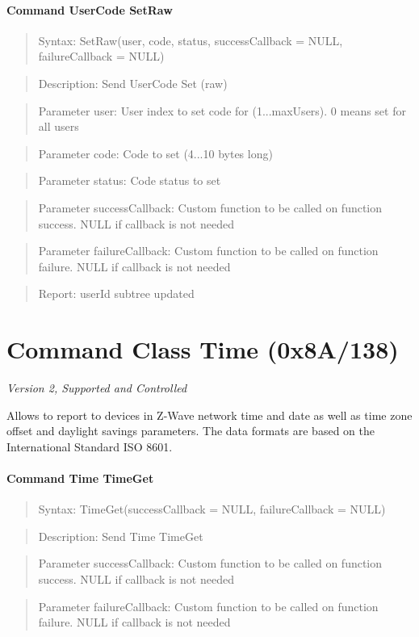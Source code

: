 \paragraph{Command UserCode SetRaw}
\begin{quote}Syntax: SetRaw(user, code, status, successCallback = NULL, failureCallback = NULL)\end{quote}
\begin{quote}Description: Send UserCode Set (raw)\end{quote}
\begin{quote}Parameter user: User index to set code for (1...maxUsers). 0 means set for all users\end{quote}
\begin{quote}Parameter code: Code to set (4...10 bytes long)\end{quote}
\begin{quote}Parameter status: Code status to set\end{quote}
\begin{quote}Parameter successCallback: Custom function to be called on function success. NULL if callback is not needed\end{quote}
\begin{quote}Parameter failureCallback: Custom function to be called on function failure. NULL if callback is not needed\end{quote}
\begin{quote}Report: userId subtree updated\end{quote}


\section{Command Class Time (0x8A/138)}

\textit{Version 2, Supported and Controlled}
\newline

Allows to report to devices in Z-Wave network time and date as well as time zone offset and daylight savings parameters. The data formats are based on the International Standard ISO 8601.
\paragraph{Command Time TimeGet}
\begin{quote}Syntax: TimeGet(successCallback = NULL, failureCallback = NULL)\end{quote}
\begin{quote}Description: Send Time TimeGet\end{quote}
\begin{quote}Parameter successCallback: Custom function to be called on function success. NULL if callback is not needed\end{quote}
\begin{quote}Parameter failureCallback: Custom function to be called on function failure. NULL if callback is not needed\end{quote}



